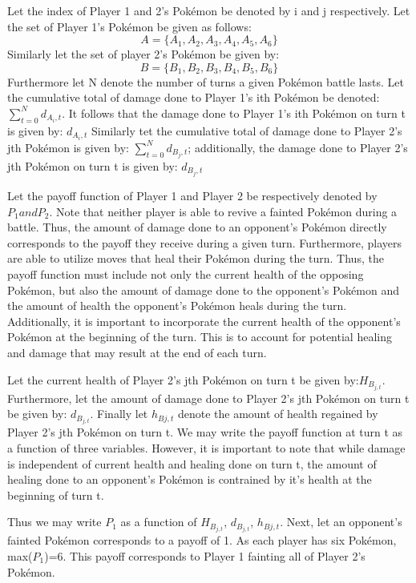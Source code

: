 \documentclass[12pt,twoside]{reedthesis}
\begin{document}
  Let the index of Player 1 and 2's Pokémon be denoted by i and j
  respectively. Let the set of Player 1's Pokémon be given as follows:
  \[A=\{A_1,A_2,A_3,A_4,A_5,A_6\}\] Similarly let the set of player 2's
  Pokémon be given by: \[B=\{B_1,B_2,B_3,B_4,B_5,B_6\}\] Furthermore let N
  denote the number of turns a given Pokémon battle lasts. Let the
  cumulative total of damage done to Player 1's ith Pokémon be denoted:
  \(\sum_{t=0}^{N} d_{A_i,t}\). It follows that the damage done to Player
  1's ith Pokémon on turn t is given by: \(d_{A_i,t}\) Similarly tet the
  cumulative total of damage done to Player 2's jth Pokémon is given by:
  \(\sum_{t=0}^{N} d_{B_j,t}\); additionally, the damage done to Player
  2's jth Pokémon on turn t is given by: \(d_{B_j,t}\)
  
  Let the payoff function of Player 1 and Player 2 be respectively denoted
  by \(P_1 and P_2\). Note that neither player is able to revive a fainted
  Pokémon during a battle. Thus, the amount of damage done to an
  opponent's Pokémon directly corresponds to the payoff they receive
  during a given turn. Furthermore, players are able to utilize moves that
  heal their Pokémon during the turn. Thus, the payoff function must
  include not only the current health of the opposing Pokémon, but also
  the amount of damage done to the opponent's Pokémon and the amount of
  health the opponent's Pokémon heals during the turn. Additionally, it is
  important to incorporate the current health of the opponent's Pokémon at
  the beginning of the turn. This is to account for potential healing and
  damage that may result at the end of each turn.
  
  Let the current health of Player 2's jth Pokémon on turn t be given
  by:\(H_{B_{j,t}}\). Furthermore, let the amount of damage done to Player
  2's jth Pokémon on turn t be given by: \(d_{B_{j,t}}\). Finally let
  \(h_{B{j,t}}\) denote the amount of health regained by Player 2's jth
  Pokémon on turn t. We may write the payoff function at turn t as a
  function of three variables. However, it is important to note that while
  damage is independent of current health and healing done on turn t, the
  amount of healing done to an opponent's Pokémon is contrained by it's
  health at the beginning of turn t.
  
  Thus we may write \(P_1\) as a function of \(H_{B_{j,t}}\),
  \(d_{B_{j,t}}\), \(h_{B{j,t}}\). Next, let an opponent's fainted Pokémon
  corresponds to a payoff of 1. As each player has six Pokémon,
  max(\(P_1\))=6. This payoff corresponds to Player 1 fainting all of
  Player 2's Pokémon.
  
\end{document}
